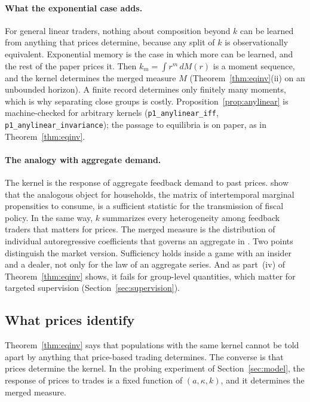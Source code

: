 \paragraph{What the exponential case adds.} For general linear traders, nothing about composition beyond $k$ can be learned from anything that prices determine, because any split of $k$ is observationally equivalent. Exponential memory is the case in which more can be learned, and the rest of the paper prices it. Then $k_m=\int r^m\,dM(r)$ is a moment sequence, and the kernel determines the merged measure $M$ (Theorem~\ref{thm:eqinv}(ii) on an unbounded horizon). A finite record determines only finitely many moments, which is why separating close groups is costly. Proposition~\ref{prop:anylinear} is machine-checked for arbitrary kernels (\texttt{p1\_anylinear\_iff}, \texttt{p1\_anylinear\_invariance}); the passage to equilibria is on paper, as in Theorem~\ref{thm:eqinv}.

\paragraph{The analogy with aggregate demand.} The kernel is the response of aggregate feedback demand to past prices. \citet{auclert2024} show that the analogous object for households, the matrix of intertemporal marginal propensities to consume, is a sufficient statistic for the transmission of fiscal policy. In the same way, $k$ summarizes every heterogeneity among feedback traders that matters for prices. The merged measure is the distribution of individual autoregressive coefficients that governs an aggregate in \citet{granger1980}. Two points distinguish the market version. Sufficiency holds inside a game with an insider and a dealer, not only for the law of an aggregate series. And as part~(iv) of Theorem~\ref{thm:eqinv} shows, it fails for group-level quantities, which matter for targeted supervision (Section~\ref{sec:supervision}).

\subsection{What prices identify}

Theorem~\ref{thm:eqinv} says that populations with the same kernel cannot be told apart by anything that price-based trading determines. The converse is that prices determine the kernel. In the probing experiment of Section~\ref{sec:model}, the response of prices to trades is a fixed function of $(a,\kappa,k)$, and it determines the merged measure.

